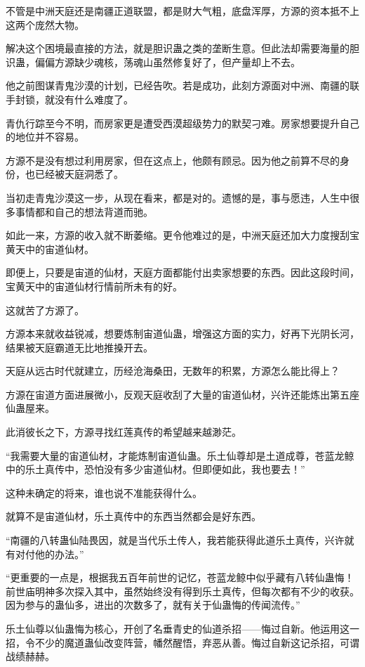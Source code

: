 \begin{this_body}
不管是中洲天庭还是南疆正道联盟，都是财大气粗，底盘浑厚，方源的资本抵不上这两个庞然大物。

解决这个困境最直接的方法，就是胆识蛊之类的垄断生意。但此法却需要海量的胆识蛊，偏偏方源缺少魂核，荡魂山虽然修复好了，但产量却上不去。

他之前图谋青鬼沙漠的计划，已经告吹。若是成功，此刻方源面对中洲、南疆的联手封锁，就没有什么难度了。

青仇行踪至今不明，而房家更是遭受西漠超级势力的默契刁难。房家想要提升自己的地位并不容易。

方源不是没有想过利用房家，但在这点上，他颇有顾忌。因为他之前算不尽的身份，也已经被天庭洞悉了。

当初走青鬼沙漠这一步，从现在看来，都是对的。遗憾的是，事与愿违，人生中很多事情都和自己的想法背道而驰。

如此一来，方源的收入就不断萎缩。更令他难过的是，中洲天庭还加大力度搜刮宝黄天中的宙道仙材。

即便上，只要是宙道的仙材，天庭方面都能付出卖家想要的东西。因此这段时间，宝黄天中的宙道仙材行情前所未有的好。

这就苦了方源了。

方源本来就收益锐减，想要炼制宙道仙蛊，增强这方面的实力，好再下光阴长河，结果被天庭霸道无比地推搡开去。

天庭从远古时代就建立，历经沧海桑田，无数年的积累，方源怎么能比得上？

方源在宙道方面进展微小，反观天庭收刮了大量的宙道仙材，兴许还能炼出第五座仙蛊屋来。

此消彼长之下，方源寻找红莲真传的希望越来越渺茫。

“我需要大量的宙道仙材，才能炼制宙道仙蛊。乐土仙尊却是土道成尊，苍蓝龙鲸中的乐土真传中，恐怕没有多少宙道仙材。但即便如此，我也要去！”

这种未确定的将来，谁也说不准能获得什么。

就算不是宙道仙材，乐土真传中的东西当然都会是好东西。

“南疆的八转蛊仙陆畏因，就是当代乐土传人，我若能获得此道乐土真传，兴许就有对付他的办法。”

“更重要的一点是，根据我五百年前世的记忆，苍蓝龙鲸中似乎藏有八转仙蛊悔！前世庙明神多次探入其中，虽然始终没有得到乐土真传，但每次都有不少的收获。因为参与的蛊仙多，进出的次数多了，就有关于仙蛊悔的传闻流传。”

乐土仙尊以仙蛊悔为核心，开创了名垂青史的仙道杀招——悔过自新。他运用这一招，令不少的魔道蛊仙改变阵营，幡然醒悟，弃恶从善。悔过自新这记杀招，可谓战绩赫赫。


\end{this_body}
